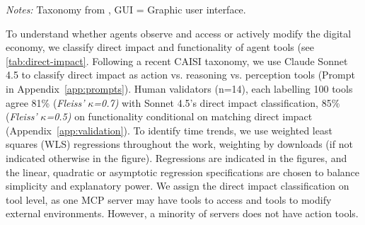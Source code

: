 \documentclass[manuscript,screen,nonacm,oneside]{acmart}
\begin{document}
\begin{table}[htbp]
\centering
\caption{Direct impact and functionality of Agent tools.}
\small
{}
\textit{Notes: }Taxonomy from \citet{CAISI2025}, GUI = Graphic user interface.
\label{tab:direct-impact}
\end{table}
To understand whether agents observe and access or actively modify the digital economy, we classify direct impact and functionality of agent tools (see \ref{tab:direct-impact}. Following a recent CAISI \citep{CAISI2025} taxonomy, we use Claude Sonnet 4.5 to classify direct impact as action vs. reasoning vs. perception tools (Prompt in Appendix~\ref{app:prompts}). Human validators (n=14), each labelling 100 tools agree 81\% (\emph{Fleiss'} \(\kappa\)\emph{=0.7)} with Sonnet 4.5's direct impact classification, 85\% (\emph{Fleiss'} \(\kappa\)\emph{=0.5)} on functionality conditional on matching direct impact (Appendix~\ref{app:validation}). To identify time trends, we use weighted least squares (WLS) regressions throughout the work, weighting by downloads (if not indicated otherwise in the figure). Regressions are indicated in the figures, and the linear, quadratic or asymptotic regression specifications are chosen to balance simplicity and explanatory power. We assign the direct impact classification on tool level, as one MCP server may have tools to access and tools to modify external environments. However, a minority of servers does not have action tools. 
\end{document}
